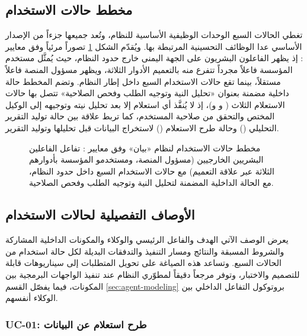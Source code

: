 \subsection{مخطط حالات الاستخدام}
\label{subsec:use-case-diagram}

تغطي الحالات السبع الوحدات الوظيفية الأساسية للنظام، وتُعد جميعها جزءاً من الإصدار الأساسي عدا الوظائف التحسينية المرتبطة بها. ويُقدّم الشكل \ref{fig:usecase-diagram} تصوراً مرئياً وفق معايير : إذ يظهر الفاعلون البشريون على الجهة اليمنى خارج حدود النظام، حيث يُمثَّل مستخدم المؤسسة فاعلاً مجرداً تتفرع منه بالتعميم الأدوار الثلاثة، ويظهر مسؤول المنصة فاعلاً مستقلاً، بينما تقع حالات الاستخدام السبع داخل إطار النظام. وتضم المخطط حالة داخلية مضمنة  بعنوان «تحليل النية وتوجيه الطلب وفحص الصلاحية»  تتصل بها حالات الاستعلام الثلاث ( و و)، إذ لا يُنفَّذ أي استعلام إلا بعد تحليل نيته وتوجيهه إلى الوكيل المختص والتحقق من صلاحية المستخدم، كما تربط علاقة  بين حالة توليد التقرير التحليلي () وحالة طرح الاستعلام () لاستخراج البيانات قبل تحليلها وتوليد التقرير.

\begin{figure}[H]
  \centering
  
  \caption[مخطط حالات الاستخدام لنظام «بيان» وفق معايير UML]{مخطط حالات الاستخدام لنظام «بيان» وفق معايير : تفاعل الفاعلين البشريين الخارجيين (مسؤول المنصة، ومستخدمو المؤسسة بأدوارهم الثلاثة عبر علاقة التعميم) مع حالات الاستخدام السبع داخل حدود النظام، مع الحالة الداخلية المضمنة لتحليل النية وتوجيه الطلب وفحص الصلاحية.}
  \label{fig:usecase-diagram}
\end{figure}

\subsection{الأوصاف التفصيلية لحالات الاستخدام}
\label{subsec:detailed-use-cases}

يعرض الوصف الآتي الهدف والفاعل الرئيسي والوكلاء والمكونات الداخلية المشاركة والشروط المسبقة والنتائج ومسار التنفيذ والتدفقات البديلة لكل حالة استخدام من الحالات السبع. وتساعد هذه الصياغة على تحويل المتطلبات إلى سيناريوهات قابلة للتصميم والاختبار، وتوفر مرجعاً دقيقاً لمطوّري النظام عند تنفيذ الواجهات البرمجية بين المكونات، فيما يفصّل القسم \ref{sec:agent-modeling} بروتوكول التفاعل الداخلي بين الوكلاء أنفسهم.

\subsubsection{UC-01: طرح استعلام عن البيانات}
\label{subsubsec:uc01}

